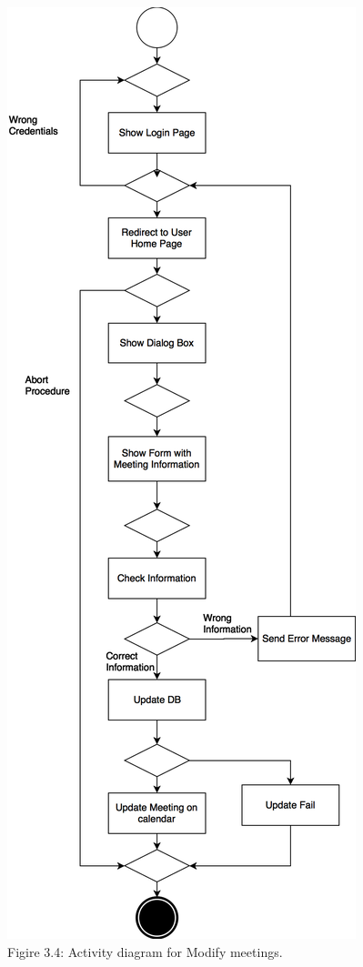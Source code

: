 \documentclass{article}
\begin{document}
	\begin{center}
		\includegraphics[scale=0.25]{img/diagrams/modify_meetings_ad.png} \\ \bigskip
		Figire 3.4: Activity diagram for Modify meetings.
	\end{center}
\end{document}
